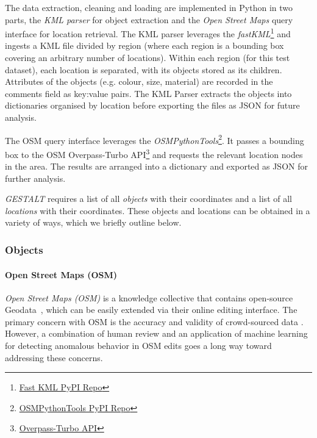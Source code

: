 The data extraction, cleaning and loading are implemented in Python in two parts, the \textit{KML parser} for object extraction and the \textit{Open Street Maps} query interface for location retrieval. 
The KML parser leverages the \textit{fastKML}\footnote{\href{https://pypi.org/project/fastkml/}{Fast KML PyPI Repo}} and ingests a KML file divided by region (where each region is a bounding box covering an arbitrary number of locations). 
Within each region (for this test dataset), each location is separated, with its objects stored as its children. 
Attributes of the objects (e.g. colour, size, material) are recorded in the comments field as key:value pairs.
The KML Parser extracts the objects into dictionaries organised by location before exporting the files as JSON for future analysis. 

The OSM query interface leverages the \textit{OSMPythonTools}\footnote{\href{https://pypi.org/project/OSMPythonTools/}{OSMPythonTools PyPI Repo}}. It passes a bounding box to the OSM Overpass-Turbo API\footnote{\href{https://overpass-turbo.eu/}{Overpass-Turbo API}} and requests the relevant location nodes in the area. 
The results are arranged into a dictionary and exported as JSON for further analysis.








\emph{GESTALT} requires a list of all \textit{objects} with their coordinates and a list of all \textit{locations} with their coordinates. These objects and locations can be obtained in a variety of ways, which we briefly outline below. 

\subsubsection{Objects}
\paragraph{Open Street Maps (OSM)}
\textit{Open Street Maps (OSM)} is a knowledge collective that contains open-source Geodata~\cite{Haklay2008}, which can be easily extended via their online editing interface.
The primary concern with OSM is the accuracy and validity of crowd-sourced data \cite{VargasMunoz2020}. However, a combination of human review and an application of machine learning for detecting anomalous behavior in OSM edits \cite{Mooney2017} goes a long way toward addressing these concerns. 

